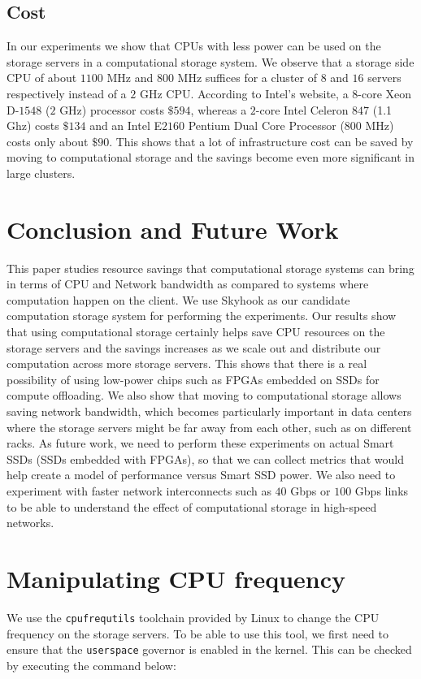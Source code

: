 \documentclass[11pt]{article}
\newcommand{\code}[1]{\colorbox{light-gray}{\texttt{#1}}}
\begin{document}
\subsection{Cost}
In our experiments we show that CPUs with less power can be used on the storage servers in a computational storage system. We observe that a storage side CPU of about $1100$ MHz and $800$ MHz suffices for a cluster of $8$ and $16$ servers respectively instead of a $2$ GHz CPU. According to Intel's website, a $8$-core Xeon D-$1548$ ($2$ GHz) processor costs $\$594$, whereas a $2$-core Intel Celeron $847$ (1.1 Ghz) costs $\$134$ and an Intel E$2160$ Pentium Dual Core Processor ($800$ MHz) costs only about $\$90$. This shows that a lot of infrastructure cost can be saved by moving to computational storage and the savings become even more significant in large clusters.

\section{Conclusion and Future Work}
\label{sec:future-and-concl}
This paper studies resource savings that computational storage systems can bring in terms of CPU and Network bandwidth as compared to systems where computation happen on the client. We use Skyhook as our candidate computation storage system for performing the experiments. Our results show that using computational storage certainly helps save CPU resources on the storage servers and the savings increases as we scale out and distribute our computation across more storage servers. This shows that there is a real possibility of using low-power chips such as FPGAs embedded on SSDs for compute offloading. We also show that moving to computational storage allows saving network bandwidth, which becomes particularly important in data centers where the storage servers might be far away from each other, such as on different racks. As future work, we need to perform these experiments on actual Smart SSDs (SSDs embedded with FPGAs), so that we can collect metrics that would help create a model of performance versus Smart SSD power. We also need to experiment with faster network interconnects such as $40$ Gbps or $100$ Gbps links to be able to understand the effect of computational storage in high-speed networks.




\appendix

\section{Manipulating CPU frequency}
\label{sec:app-cpu}
We use the \code{cpufrequtils} toolchain provided by Linux to change the CPU frequency on the storage servers. To be able to use this tool, we first need to ensure that the \code{userspace} governor is enabled in the kernel. This can be checked by executing the command below:
\end{document}
